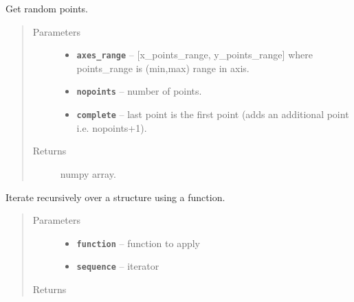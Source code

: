 \documentclass[letterpaper,10pt,english]{sphinxmanual}
\begin{document}
\begin{fulllineitems}
\label{RRtoolbox.lib.arrayops:RRtoolbox.lib.arrayops.basic.random_points}
Get random points.
\begin{quote}\begin{description}
\item[{Parameters}] \leavevmode\begin{itemize}
\item {} 
\textbf{\texttt{axes\_range}} -- {[}x\_points\_range, y\_points\_range{]} where points\_range is (min,max) range in axis.

\item {} 
\textbf{\texttt{nopoints}} -- number of points.

\item {} 
\textbf{\texttt{complete}} -- last point is the first point (adds an additional point i.e. nopoints+1).

\end{itemize}

\item[{Returns}] \leavevmode
numpy array.

\end{description}\end{quote}

\end{fulllineitems}


\begin{fulllineitems}
\label{RRtoolbox.lib.arrayops:RRtoolbox.lib.arrayops.basic.recursiveMap}
Iterate recursively over a structure using a function.
\begin{quote}\begin{description}
\item[{Parameters}] \leavevmode\begin{itemize}
\item {} 
\textbf{\texttt{function}} -- function to apply

\item {} 
\textbf{\texttt{sequence}} -- iterator

\end{itemize}

\item[{Returns}] \leavevmode


\end{description}\end{quote}

\end{fulllineitems}
\end{document}

